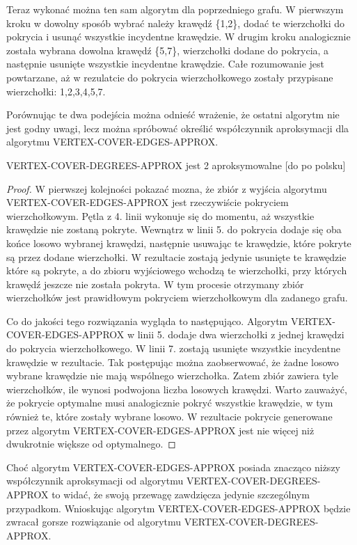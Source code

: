 

	Teraz wykonać można ten sam algorytm dla poprzedniego grafu. W pierwszym kroku w dowolny sposób wybrać należy krawędź \{1,2\}, dodać te wierzchołki do pokrycia i usunąć wszystkie incydentne krawędzie. W drugim kroku analogicznie została wybrana dowolna krawędź \{5,7\}, wierzchołki dodane do pokrycia, a następnie usunięte wszystkie incydentne krawędzie. Całe rozumowanie jest powtarzane, aż w rezulatcie do pokrycia wierzchołkowego zostały przypisane wierzchołki: 1,2,3,4,5,7.



Porównując te dwa podejścia można odnieść wrażenie, że ostatni algorytm nie jest godny uwagi, lecz można spróbować określić współczynnik aproksymacji dla algorytmu VERTEX-COVER-EDGES-APPROX.

\begin{twr}
VERTEX-COVER-DEGREES-APPROX jest 2 aproksymowalne [do po polsku]
\end{twr}

\begin{proof}
W pierwszej kolejności pokazać mozna, że zbiór z wyjścia algorytmu VERTEX-COVER-EDGES-APPROX jest rzeczywiście pokryciem wierzchołkowym. Pętla z 4. linii wykonuje się do momentu, aż wszystkie krawędzie nie zostaną pokryte. Wewnątrz w linii 5. do pokrycia dodaje się oba końce losowo wybranej krawędzi, następnie usuwając te krawędzie, które pokryte są przez dodane wierzchołki. W rezultacie zostają jedynie usunięte te krawędzie które są pokryte, a do zbioru wyjściowego wchodzą te wierzchołki, przy których krawędź jeszcze nie została pokryta. W tym procesie otrzymany zbiór wierzchołków jest prawidłowym pokryciem wierzchołkowym dla zadanego grafu.

Co do jakości tego rozwiązania wygląda to następująco. Algorytm VERTEX-COVER-EDGES-APPROX w linii 5. dodaje dwa wierzchołki z jednej krawędzi do pokrycia wierzchołkowego. W linii 7. zostają usunięte wszystkie incydentne krawędzie w rezultacie. Tak postępując można zaobserwować, że żadne losowo wybrane krawędzie nie mają wspólnego wierzchołka. Zatem zbiór zawiera tyle wierzchołków, ile wynosi podwojona liczba losowych krawędzi. Warto zauważyć, że pokrycie optymalne musi analogicznie pokryć wszystkie krawędzie, w tym również te, które zostały wybrane losowo. W rezultacie pokrycie generowane przez algorytm VERTEX-COVER-EDGES-APPROX jest nie więcej niż dwukrotnie większe od optymalnego.
\end{proof}

Choć algorytm VERTEX-COVER-EDGES-APPROX posiada znacząco niższy współczynnik aproksymacji od algorytmu VERTEX-COVER-DEGREES-APPROX to widać, że swoją przewagę zawdzięcza jedynie szczególnym przypadkom. Wnioskując algorytm VERTEX-COVER-EDGES-APPROX będzie zwracał gorsze rozwiązanie od algorytmu VERTEX-COVER-DEGREES-APPROX.